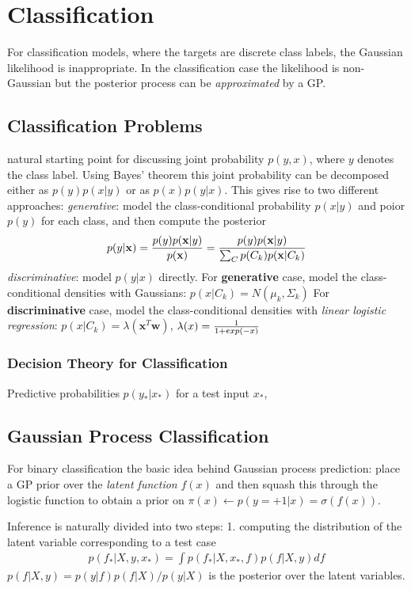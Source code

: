 \documentclass[a4paper]{article}
\begin{document}
\section{Classification}

For classification models, where the targets are discrete class labels, the Gaussian likelihood is inappropriate.
In the classification case the likelihood is non-Gaussian but the posterior process can be \emph{approximated} by a GP.

\subsection{Classification Problems}
natural starting point for discussing joint probability $p(y, x)$, where $y$ denotes the class label. Using Bayes’ theorem this joint probability can be decomposed either as $p(y)p(x|y)$ or as $p(x)p(y|x)$. This gives rise to two different approaches:
\emph{generative}: model the class-conditional probability $p(x|y)$ and poior $p(y)$ for each class, and then compute the posterior
\begin{align}
  p(y|\mathbf{x}) = { p(y)p(\mathbf{x}|y) \over p(\mathbf{x})} = {p(y)p(\mathbf{x}|y) \over \sum_C p(C_k)p(\mathbf{x}|C_k) }
\end{align}
\emph{discriminative}: model $p(y|x)$ directly.
For \textbf{generative} case, model the class-conditional densities with Gaussians: $p(x|C_k) = N(\mu_k, \Sigma_k)$
For \textbf{discriminative} case, model the class-conditional densities with \emph{linear logistic regression}: $p(x|C_k) = \lambda(\mathbf{x}^T\mathbf{w})$, $\lambda(x) = {1 \over 1+exp(-x)} $

\subsubsection{Decision Theory for Classification}
Predictive probabilities $p(y_* |x_*)$ for a test input $x_*$,

\subsection{Gaussian Process Classification}
For binary classification the basic idea behind Gaussian process prediction:
place a GP prior over the \emph{latent function} $f(x)$ and then squash this through the logistic function to obtain a prior on $\pi(x) \gets  p(y=+1|x) = \sigma(f(x))$.

Inference is naturally divided into two steps:
1. computing the distribution of the latent variable corresponding to a test case
\begin{align}
\label{eq:latent_dist}
  p(f_*|X,y,x_*) = \int p(f_*|X,x_*,f)p(f|X,y) df
\end{align}
$p(f|X,y) = p(y|f)p(f|X)/p(y|X)$ is the posterior over the latent variables.
\end{document}

